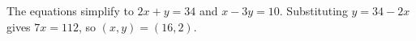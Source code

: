 The equations simplify to $2x+y=34$ and $x-3y=10$. Substituting $y=34-2x$ gives $7x=112$, so $\boxed{(x,y)=(16,2)}$.
